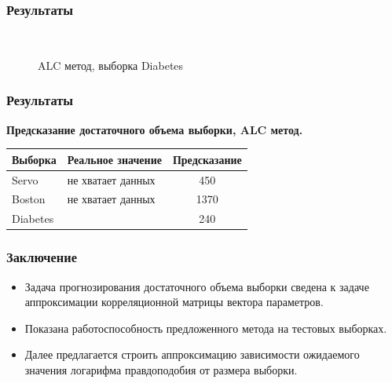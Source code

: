 \documentclass{beamer}
\begin{document}
\begin{frame}
\frametitle{Результаты}
\begin{figure}[h!t]\center
{}\\

\caption{ALC метод, выборка Diabetes}
\label{fig1}
\end{figure}
\end{frame}

\begin{frame}
\frametitle{Результаты}


\textbf{Предсказание достаточного объема выборки, ALC метод.}
\begin{table}[h]
\label{table2}
\begin{tabularx}{0.7\textwidth}{|p{1in}|X|c|}
\hline
	\centering Выборка & \centering Реальное значение &Предсказание\\
	\hline
	 Servo & \centering не хватает данных & 450\\
	\hline
	Boston & \centering не хватает данных &1370\\
	\hline
	Diabetes & \centering 235 & 240\\
\hline
\end{tabularx}
\end{table}

\end{frame}

\begin{frame}
\frametitle{Заключение}

\begin{itemize}
  \item Задача прогнозирования достаточного объема выборки сведена к задаче аппроксимации корреляционной матрицы вектора параметров.
  \item Показана работоспособность предложенного метода на тестовых выборках.
  \item Далее предлагается строить аппроксимацию зависимости ожидаемого значения логарифма правдоподобия от размера выборки.
\end{itemize}

\end{frame}
\end{document}
